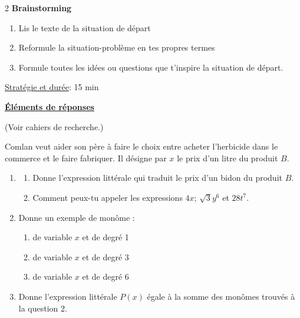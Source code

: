 \begin{multicols*}{2}
  	 \textbf{ Brainstorming}\\
  	\begin{enumerate}
  		\item  Lis le texte de la situation de départ 
  		\item  Reformule la situation-problème en tes 
  		propres termes 
  		\item  Formule toutes les idées ou questions que 
  		t’inspire la situation de départ.
  	\end{enumerate}
  	
  	\underline{Stratégie et durée}: 15 min
  	\begin{center}
  		\underline{\textbf{Éléments de réponses}}
  	\end{center}
  	(Voir cahiers de recherche.)
  		\setcounter{sequen}{0}
  		\setcounter{q}{0}
  	
  	Comlan veut aider son père à faire le choix entre acheter l'herbicide  dans le commerce et le faire fabriquer. Il désigne par $x$ le prix d'un litre du produit $B$.
  	
  	\begin{enumerate}
  		\item 
  		\begin{enumerate}
  			\item  Donne l'expression littérale qui traduit le prix d'un bidon du produit $B$.
  			
  			\item  Comment peux-tu appeler les expressions $4x$; $\sqrt{3}y^6$ et $28t^7$.
  		\end{enumerate}
  		\item Donne un exemple de monôme :
  		\begin{enumerate}
  			\item de variable $x$ et de degré 1
  			\item  de variable $x$ et de degré 3
  			\item  de variable $x$ et de degré 6
  		\end{enumerate}
  		\item  Donne l'expression littérale $P(x)$ égale à la somme des monômes trouvés à la question 2. 
  		

\end{enumerate}
\end{multicols*}
